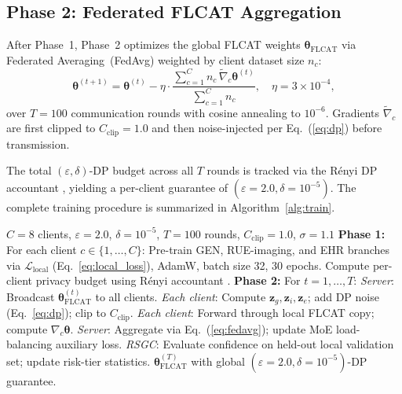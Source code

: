 \documentclass[a4paper,fleqn]{cas-dc}
\begin{document}
\subsection{Phase 2: Federated FLCAT Aggregation}

After Phase~1, Phase~2 optimizes the global FLCAT weights
$\boldsymbol{\theta}_{\mathrm{FLCAT}}$ via Federated Averaging~(FedAvg)
\citep{mcmahan2017} weighted by client dataset size $n_c$:
\begin{equation}
\boldsymbol{\theta}^{(t+1)} = \boldsymbol{\theta}^{(t)} -
\eta\cdot\frac{\sum_{c=1}^{C}n_c\,\tilde{\nabla}_c\boldsymbol{\theta}^{(t)}}
{\sum_{c=1}^{C}n_c},\quad\eta\!=\!3\!\times\!10^{-4},
\label{eq:fedavg}
\end{equation}
over $T\!=\!100$ communication rounds with cosine annealing to $10^{-6}$.
Gradients $\tilde{\nabla}_c$ are first clipped to $C_{\mathrm{clip}}\!=\!1.0$
and then noise-injected per Eq.~(\ref{eq:dp}) before transmission.

The total $(\varepsilon,\delta)$-DP budget across all $T$ rounds is
tracked via the R\'{e}nyi DP accountant \citep{mironov2017renyi}, yielding
a per-client guarantee of $(\varepsilon\!=\!2.0,\delta\!=\!10^{-5})$.
The complete training procedure is summarized in Algorithm~\ref{alg:train}.

\begin{algorithm}[!t]
\caption{FMBM-Net Two-Phase Federated Training}
\label{alg:train}
\begin{algorithmic}[1]
\REQUIRE $C\!=\!8$ clients, $\varepsilon\!=\!2.0$, $\delta\!=\!10^{-5}$,
         $T\!=\!100$ rounds, $C_{\mathrm{clip}}\!=\!1.0$, $\sigma\!=\!1.1$
\STATE \textbf{Phase 1:} For each client $c \in \{1,\ldots,C\}$:
\STATE \quad Pre-train GEN, RUE-imaging, and EHR branches via
       $\mathcal{L}_{\mathrm{local}}$ (Eq.~\ref{eq:local_loss}),
       AdamW, batch size 32, 30 epochs.
\STATE \quad Compute per-client privacy budget using
       R\'{e}nyi accountant \citep{mironov2017renyi}.
\STATE \textbf{Phase 2:} For $t = 1, \ldots, T$:
\STATE \quad \textit{Server}: Broadcast
       $\boldsymbol{\theta}_{\mathrm{FLCAT}}^{(t)}$ to all clients.
\STATE \quad \textit{Each client}: Compute $\mathbf{z}_g, \mathbf{z}_i,
       \mathbf{z}_e$; add DP noise (Eq.~\ref{eq:dp}); clip to
       $C_{\mathrm{clip}}$.
\STATE \quad \textit{Each client}: Forward through local FLCAT copy;
       compute $\nabla_c\boldsymbol{\theta}$.
\STATE \quad \textit{Server}: Aggregate via Eq.~(\ref{eq:fedavg}); update
       MoE load-balancing auxiliary loss.
\STATE \quad \textit{RSGC}: Evaluate confidence on held-out local
       validation set; update risk-tier statistics.
\ENSURE $\boldsymbol{\theta}_{\mathrm{FLCAT}}^{(T)}$ with global
        $(\varepsilon\!=\!2.0,\delta\!=\!10^{-5})$-DP guarantee.
\end{algorithmic}
\end{algorithm}
\end{document}
